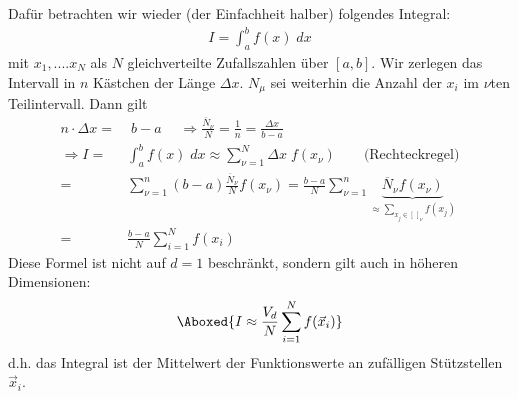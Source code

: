 \documentclass[12pt]{article}
\begin{document}
Dafür betrachten wir wieder (der Einfachheit halber) folgendes Integral:
\begin{align}
I= \int_a^b f(x) \; dx
\end{align}
mit $x_1,....x_N$ als $N$ gleichverteilte Zufallszahlen über $[a,b]$. %
Wir zerlegen das Intervall in $n$ Kästchen der Länge $\Delta x$.
$N_\mu$ sei weiterhin die Anzahl der $x_i$ im $\nu$ten Teilintervall. Dann gilt
\begin{align}
n \cdot \Delta x =&\;  b-a \; \quad
\Rightarrow \frac{\overline{N}_\nu}{N}= \frac{1}{n}= \frac{\Delta x}{b-a} \\
 \Rightarrow I= & \int_a^b f(x) \; dx  \approx  \sum_{\nu =1}^N \Delta x \; f(x_\nu )  \quad \quad \mbox{(Rechteckregel)} \\
 =& \sum_{\nu =1}^n (b-a)  \frac{\overline{N}_\nu}{N} f(x_\nu) 
= \frac{b-a}{N} \sum_{\nu =1}^n \underbrace{\overline{N}_\nu f(x_\nu)}_{ \approx \sum_{x_j \in [\,]_\nu} f(x_j)} \\ =& \frac{b-a}{N} \sum_{i=1}^N f(x_i)
\end{align}
Diese Formel ist nicht auf $d=1$ beschränkt, sondern gilt auch in höheren Dimensionen:
\begin{align}
\Aboxed{ I \approx \frac{V_d}{N} \sum_{i=1}^N f(\vec{x}_i) }
\end{align}
d.h. das Integral ist der Mittelwert der Funktionswerte an zufälligen Stützstellen $\vec{x}_i$.\\
\end{document}
